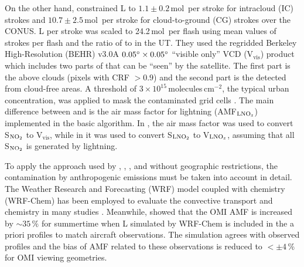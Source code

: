 \documentclass[amt]{copernicus}
\begin{document}
On the other hand, \citet{Lapierre.2020} constrained L to $1.1 \pm 0.2$\,mol\, per stroke for intracloud (IC) strokes and $10.7 \pm 2.5$\,mol\, per stroke for cloud-to-ground (CG) strokes over the CONUS.
L per stroke was scaled to 24.2\,mol\, per flash using mean values of strokes per flash and the ratio of  to  in the UT.
They used the regridded Berkeley High-Resolution (BEHR) v3.0A $0.05{^{\circ}} \times 0.05{^{\circ}}$ ``visible only''  VCD (V$_\mathrm{vis}$) product which includes two parts of  that can be ``seen'' by the satellite.
The first part is the  above clouds (pixels with CRF $> 0.9$) and the second part is the  detected from cloud-free areas.
A threshold of $3 \times 10^{15}$\,molecules\,cm$^{-2}$, the typical urban  concentration, was applied to mask the contaminated grid cells \citep{Beirle.2010,Laughner.2017}.
The main difference between \citet{Lapierre.2020} and \citet{Pickering.2016} is the air mass factor for lightning (AMF$_\chem{LNO_\mathit{x}}$) implemented in the basic algorithm.
In \citet{Lapierre.2020}, the air mass factor was used to convert S$_\chem{NO_2}$ to V$_\mathrm{vis}$, while in \citet{Pickering.2016} it was used to convert S$_\chem{LNO_2}$ to V$_\chem{LNO_\mathit{x}}$, assuming that all S$_\chem{NO_2}$ is generated by lightning.

To apply the approach used by \citet{Bucsela.2010}, \citet{Pickering.2016}, \citet{Bucsela.2019}, and \citet{Lapierre.2020} without geographic restrictions, the contamination by anthropogenic emissions must be taken into account in detail.
The Weather Research and Forecasting (WRF) model coupled with chemistry (WRF-Chem) has been employed to evaluate the convective transport and chemistry in many studies \citep{Barth.2012,Wong.2013,Fried.2016,Li.2017}.
Meanwhile, \citet{Laughner.2017} showed that the OMI AMF is increased by $\sim35\,{\%}$ for summertime when L simulated by WRF-Chem is included in the a priori profiles to match aircraft observations.
The simulation agrees with observed  profiles and the bias of AMF related to these observations is reduced to $< \pm4$\,{\%} for OMI viewing geometries.
\end{document}
